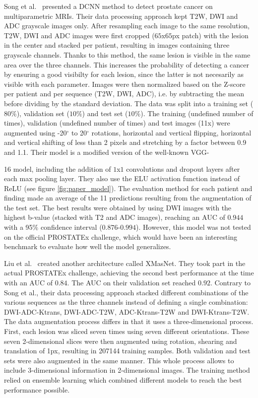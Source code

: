 Song et al.~\cite{07} presented a DCNN method to detect prostate cancer on multiparametric MRIs. Their data processing approach kept T2W, DWI and ADC grayscale images only. After resampling each image to the same resolution, T2W, DWI and ADC images were first cropped ($65$x$65$px patch) with the lesion in the center and stacked per patient, resulting in images containing three grayscale channels. Thanks to this method, the same lesion is visible in the same area over the three channels. This increases the probability of detecting a cancer by ensuring a good visibilty for each lesion, since the latter is not necesarily as visible with each parameter. Images were then normalized based on the Z-score per patient and per sequence (T2W, DWI, ADC), i.e. by subtracting the mean before dividing by the standard deviation. The data was split into a training set ($80\%$), validation set ($10\%$) and test set ($10\%$). The training (undefined number of times), validation (undefined number of times) and test images (11x) were augmented using -20$^\circ$ to 20$^\circ$ rotations, horizontal and vertical flipping, horizontal and vertical shifting of less than 2 pixels and stretching by a factor between 0.9 and 1.1.
Their model is a modified version of the well-known VGG-


16 model, including the addition of $1$x$1$ convolutions and dropout layers after each max pooling layer. They also use the ELU activation function instead of ReLU (see figure \ref{fig:paper_model}). The evaluation method for each patient and finding made an average of the 11 predictions resulting from the augmentation of the test set. The best results were obtained by using DWI images with the highest b-value (stacked with T2 and ADC images), reaching an AUC of $0.944$ with a 95$\%$ confidence interval ($0.876$-$0.994$). However, this model was not tested on the official PROSTATEx challenge, which would have been an interesting benchmark to evaluate how well the model generalizes.

Liu et al.~\cite{46} created another architecture called XMasNet. They took part in the actual PROSTATEx challenge, achieving the second best performance at the time with an AUC of $0.84$. The AUC on their validation set reached $0.92$. Contrary to Song et al., their data processing approach stacked different combinations of the various sequences as the three channels instead of defining a single combination: DWI-ADC-Ktrans, DWI-ADC-T2W, ADC-Ktrans-T2W and DWI-Ktrans-T2W. The data augmentation process differs in that it uses a three-dimensional process. First, each lesion was sliced seven times using seven different orientations. These seven 2-dimensional slices were then augmented using rotation, shearing and translation of 1px, resulting in 207144 training samples. Both validation and test sets were also augmented in the same manner. This whole process allows to include 3-dimensional information in 2-dimensional images. The training method relied on ensemble learning which combined different models to reach the best performance possible.

